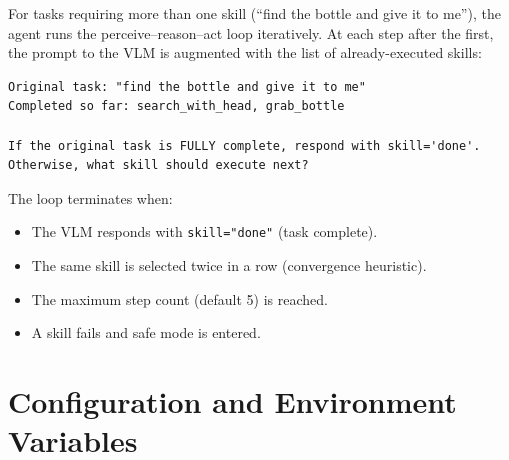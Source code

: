 For tasks requiring more than one skill (\eg ``find the bottle and give it to me''),
the agent runs the perceive--reason--act loop iteratively.
At each step after the first, the prompt to the VLM is augmented with the list of
already-executed skills:

\begin{mdframed}[style=promptbox]
\small
\begin{verbatim}
Original task: "find the bottle and give it to me"
Completed so far: search_with_head, grab_bottle

If the original task is FULLY complete, respond with skill='done'.
Otherwise, what skill should execute next?
\end{verbatim}
\end{mdframed}

The loop terminates when:
\begin{itemize}[noitemsep]
  \item The VLM responds with \texttt{skill="done"} (task complete).
  \item The same skill is selected twice in a row (convergence heuristic).
  \item The maximum step count (default 5) is reached.
  \item A skill fails and safe mode is entered.
\end{itemize}

\section{Configuration and Environment Variables}

